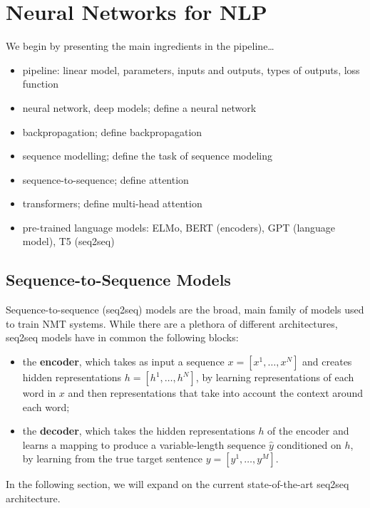 \section{Neural Networks for NLP}
\label{sec:nmt}

We begin by presenting the main ingredients in the pipeline\dots

\begin{itemize}
    \item pipeline: linear model, parameters, inputs and outputs, types of outputs, loss function
    \item neural network, deep models; define a neural network
    \item backpropagation; define backpropagation
    \item sequence modelling; define the task of sequence modeling
    \item sequence-to-sequence; define attention
    \item transformers; define multi-head attention
    \item pre-trained language models: ELMo, BERT (encoders), GPT (language model), T5 (seq2seq)
\end{itemize}

\subsection{Sequence-to-Sequence Models}
\label{sec:transformer_bg}

Sequence-to-sequence (seq2seq) models are the broad, main family of models
used to train NMT systems. While there are a plethora of different architectures,
seq2seq models have in common the following blocks:

\begin{itemize}
    \item the {\bf encoder}, which takes as input a sequence $x=[x^1,
              \dots, x^N]$ and creates hidden representations $h=[h^1, \dots,
              h^N]$, by learning representations of each word in $x$ and then
          representations that take into account the context around each word;
    \item the {\bf decoder}, which takes the hidden representations
          $h$ of the encoder and learns a mapping to produce a
          variable-length sequence $\hat{y}$ conditioned on $h$, by
          learning from the true target sentence $y=[y^1, \dots, y^M]$.
\end{itemize}

In the following section, we will expand on the current
state-of-the-art seq2seq architecture.

